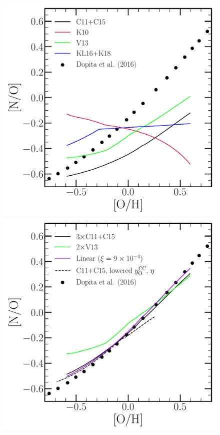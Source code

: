 \documentclass[ms.tex]{subfiles}
\begin{document}
\begin{figure} 
\centering 
\includegraphics[scale = 0.3]{no_oh_predictions_unmodified.pdf} 
\includegraphics[scale = 0.3]{no_oh_predictions.pdf} 

\end{figure}
\end{document}

